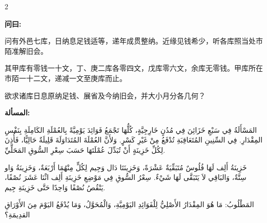 \documentclass[11pt,a4paper]{article}
\newcommand{\ar}[1]{\arabicfont\beginR #1\endR}
\newenvironment{bilingual}{%
  \begin{paracol}{2}
}{%
  \end{paracol}
}
\newcommand{\cnlabel}[1]{\textcolor{algocolor}{\textbf{#1}}}
\newcommand{\arlabel}[1]{\ar{\textcolor{algocolor}{\textbf{#1}}}}
\begin{document}
\begin{bilingual}

\begin{leftcolumn*}
\cnlabel{问曰:}

问有外邑七库，日纳息足钱适等，递年成贯整纳。近缘见钱希少，听各库照当处市陌准解旧会。

其甲库有零钱一十文，丁、庚二库各零四文，戊库零六文，余库无零钱。甲库所在市陌一十二文，递减一文至庚库而止。

欲求诸库日息原纳足钱、展省及今纳旧会，并大小月分各几何？
\end{leftcolumn*}

\begin{rightcolumn*}
\arlabel{المسألة:}

\ar{المَسْأَلَةُ فِي سَبْعِ خَزَائِنَ فِي مُدُنٍ خَارِجِيَّةٍ، كُلُّهَا تَجْمَعُ فَوَائِدَ يَوْمِيَّةً بِالعُمْلَةِ الكَامِلَةِ بِنَفْسِ المِقْدَارِ. فِي السِّنِينِ المُتَعَاقِبَةِ تُدْفَعُ مِنْ غَيْرِ كَسْرٍ. وَلأَنَّ العُمْلَةَ المُتَدَاوَلَةَ قَلِيلَةٌ حَالِيًّا، فَأُذِنَ لِكُلِّ خَزِينَةٍ أَنْ تُبَدِّلَ عُمْلَتَهَا حَسَبَ سِعْرِ السُّوقِ المَحَلِّيِّ.}

\ar{خَزِينَةُ أَلِف لَهَا فُلُوسٌ مُتَبَقِّيَةٌ عَشْرَةً، وَخَزِينَتَا دَال وَجِيم لِكُلٍّ مِنْهُمَا أَرْبَعَةٌ، وَخَزِينَةُ وَاو سِتَّةٌ، وَالبَاقِي لاَ يَتَبَقَّى لَهَا شَيْءٌ. سِعْرُ السُّوقِ فِي مَوْضِعِ خَزِينَةِ أَلِف اثْنَا عَشَرَ نُصْفًا، يَنْقُصُ نُصْفًا وَاحِدًا حَتَّى خَزِينَةِ جِيم.}

\ar{المَطْلُوبُ: مَا هُوَ المِقْدَارُ الأَصْلِيُّ لِلْفَوَائِدِ اليَوْمِيَّةِ، وَالْمُحَوَّلُ، وَمَا يُدْفَعُ اليَوْمَ مِنَ الأَوْرَاقِ القدِيمَةِ؟}
\end{rightcolumn*}

\end{bilingual}

\vspace{1em}
\end{document}
